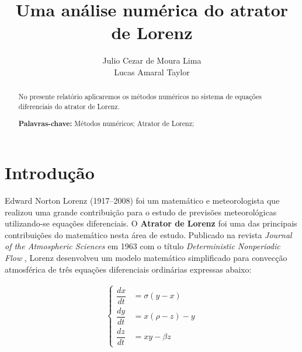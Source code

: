 \documentclass[12pt, a4paper]{article}
\title{Uma análise numérica do atrator de Lorenz}
\author{Julio Cezar de Moura Lima \\ Lucas Amaral Taylor}
\begin{document}
    \maketitle
    

        \begin{abstract}
            \begin{center}
                No presente relatório aplicaremos os métodos numéricos no sistema de equações diferenciais do atrator de Lorenz.
            
                \vspace{0.25cm}
            
                \noindent \textbf{Palavras-chave:} Métodos numéricos; Atrator de Lorenz;
            \end{center}
        \end{abstract}

    
    
    \section{Introdução}\label{introdução}
    
    Edward Norton Lorenz (1917–2008) foi um matemático e meteorologista que
    realizou uma grande contribuição para o estudo de previsões meteorológicas
    utilizando-se equações diferenciais. O \textbf{Atrator de Lorenz }foi uma das
    principais contribuições do matemático nesta área de estudo. Publicado na
    revista \textit{Journal of the Atmospheric Sciences} em 1963 com o título
    \textit{Deterministic Nonperiodic Flow} \cite{Lorenz1963}, Lorenz desenvolveu
    um modelo matemático simplificado para convecção atmosférica de três equações
    diferenciais ordinárias expressas abaixo:
    
    \begin{align}
        \begin{cases}
            \dfrac{dx}{dt} & = \sigma(y-x)     \\
            \dfrac{dy}{dt} & = x(\rho - z) - y \\
            \dfrac{dz}{dt} & = xy - \beta z
        \end{cases}
        \label{eq:apresentacao-sistema}
    \end{align}
    
\end{document}
